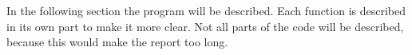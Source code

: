 In the following section the program will be described. Each function is described in its own part to make it more clear. Not all parts of the code will be described, because this would make the report too long. 